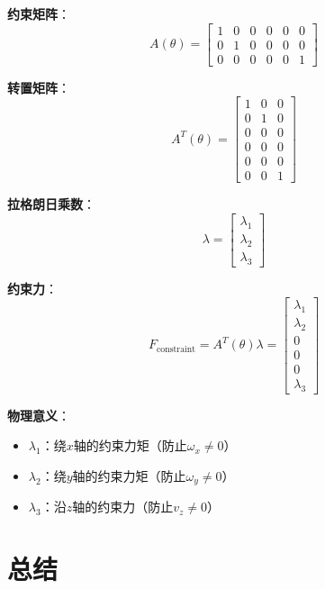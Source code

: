 \documentclass[12pt,a4paper]{article}
\begin{document}
\textbf{约束矩阵}：
\begin{equation}
A(\theta) = \begin{bmatrix}
1 & 0 & 0 & 0 & 0 & 0 \\
0 & 1 & 0 & 0 & 0 & 0 \\
0 & 0 & 0 & 0 & 0 & 1
\end{bmatrix}
\end{equation}

\textbf{转置矩阵}：
\begin{equation}
A^T(\theta) = \begin{bmatrix}
1 & 0 & 0 \\
0 & 1 & 0 \\
0 & 0 & 0 \\
0 & 0 & 0 \\
0 & 0 & 0 \\
0 & 0 & 1
\end{bmatrix}
\end{equation}

\textbf{拉格朗日乘数}：
\begin{equation}
\lambda = \begin{bmatrix} \lambda_1 \\ \lambda_2 \\ \lambda_3 \end{bmatrix}
\end{equation}

\textbf{约束力}：
\begin{equation}
F_{\text{constraint}} = A^T(\theta)\lambda = \begin{bmatrix}
\lambda_1 \\  %
\lambda_2 \\  %
0 \\          %
0 \\          %
0 \\          %
\lambda_3     %
\end{bmatrix}
\end{equation}

\textbf{物理意义}：
\begin{itemize}
\item $\lambda_1$：绕$x$轴的约束力矩（防止$\omega_x \neq 0$）
\item $\lambda_2$：绕$y$轴的约束力矩（防止$\omega_y \neq 0$）
\item $\lambda_3$：沿$z$轴的约束力（防止$v_z \neq 0$）
\end{itemize}

\section{总结}
\end{document}
